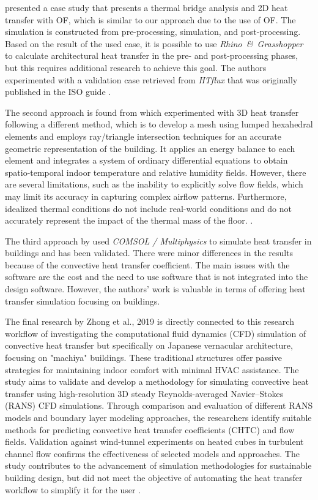 \cite{kastner2020solving} presented a case study that presents a thermal bridge analysis and 2D heat transfer with \gls{OF}, which is similar to our approach due to the use of \gls{OF}. The simulation is constructed from pre-processing, simulation, and post-processing. 
Based on the result of the used case, it is possible to use \textit{Rhino\ \&\ Grasshopper} to calculate architectural heat transfer in the pre- and post-processing phases, but this requires additional research to achieve this goal. 
The authors experimented with a validation case retrieved from \textit{HTflux} that was originally published in the ISO guide \cite{kastner2020solving,ISO}. 

The second approach is found from \cite{Yang} which experimented with 3D heat transfer following a different method, which is to develop a mesh using lumped hexahedral elements and employs ray/triangle intersection techniques for an accurate geometric representation of the building. 
It applies an energy balance to each element and integrates a system of ordinary differential equations to obtain spatio-temporal indoor temperature and relative humidity fields. 
However, there are several limitations, such as the inability to explicitly solve flow fields, which may limit its accuracy in capturing complex airflow patterns. 
Furthermore, idealized thermal conditions do not include real-world conditions and do not accurately represent the impact of the thermal mass of the floor. 
\cite{Yang}. 


The third approach by \cite{COMSOL} used \textit{COMSOL / Multiphysics} to simulate heat transfer in buildings and has been validated. There were minor differences in the results because of the convective heat transfer coefficient. 
The main issues with the software are the cost and the need to use software that is not integrated into the design software.
However, the authors' work is valuable in terms of offering heat transfer simulation focusing on buildings.  %

The final research by Zhong et al., 2019 \cite{litrev2} is directly connected to this research workflow of investigating the computational fluid dynamics (CFD) simulation of convective heat transfer but specifically on Japanese vernacular architecture, focusing on "machiya" buildings. These traditional structures offer passive strategies for maintaining indoor comfort with minimal HVAC assistance. The study aims to validate and develop a methodology for simulating convective heat transfer using high-resolution 3D steady Reynolds-averaged Navier–Stokes (RANS) CFD simulations. Through comparison and evaluation of different RANS models and boundary layer modeling approaches, the researchers identify suitable methods for predicting convective heat transfer coefficients (CHTC) and flow fields. Validation against wind-tunnel experiments on heated cubes in turbulent channel flow confirms the effectiveness of selected models and approaches. The study contributes to the advancement of simulation methodologies for sustainable building design, but did not meet the objective of automating the heat transfer workflow to simplify it for the user \cite{litrev2}. 



